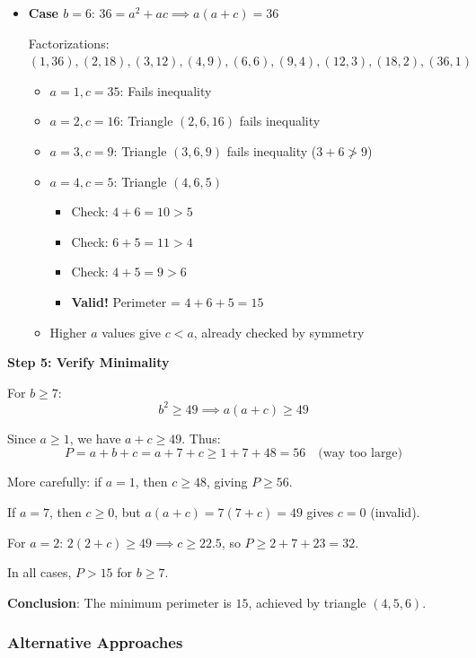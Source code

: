 \documentclass[12pt]{article}
\begin{document}
\begin{solutionbox}
\begin{itemize}
    \item \textbf{Case $b = 6$}: $36 = a^2 + ac \implies a(a+c) = 36$
    
    Factorizations: $(1,36), (2,18), (3,12), (4,9), (6,6), (9,4), (12,3), (18,2), (36,1)$
    \begin{itemize}
        \item $a = 1, c = 35$: Fails inequality
        \item $a = 2, c = 16$: Triangle $(2,6,16)$ fails inequality
        \item $a = 3, c = 9$: Triangle $(3,6,9)$ fails inequality ($3+6 \not> 9$)
        \item $a = 4, c = 5$: Triangle $(4,6,5)$
        \begin{itemize}
            \item Check: $4+6=10 > 5$ \checkmark
            \item Check: $6+5=11 > 4$ \checkmark
            \item Check: $4+5=9 > 6$ \checkmark
            \item \textbf{Valid!} Perimeter = $4+6+5 = 15$
        \end{itemize}
        \item Higher $a$ values give $c < a$, already checked by symmetry
    \end{itemize}
\end{itemize}

\textbf{Step 5: Verify Minimality}

For $b \geq 7$:
$$b^2 \geq 49 \implies a(a+c) \geq 49$$

Since $a \geq 1$, we have $a+c \geq 49$. Thus:
$$P = a + b + c = a + 7 + c \geq 1 + 7 + 48 = 56 \quad \text{(way too large)}$$

More carefully: if $a = 1$, then $c \geq 48$, giving $P \geq 56$.

If $a = 7$, then $c \geq 0$, but $a(a+c) = 7(7+c) = 49$ gives $c = 0$ (invalid).

For $a = 2$: $2(2+c) \geq 49 \implies c \geq 22.5$, so $P \geq 2 + 7 + 23 = 32$.

In all cases, $P > 15$ for $b \geq 7$.

\textbf{Conclusion}: The minimum perimeter is $\boxed{15}$, achieved by triangle $(4,5,6)$.

\subsubsection*{Alternative Approaches}


\end{solutionbox}
\end{document}
